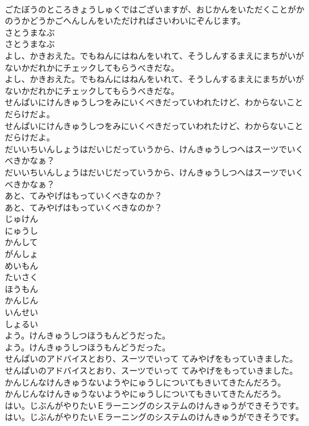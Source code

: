 \documentclass[8pt]{extreport}
\begin{document}
\begin{CJK}{UTF8}{min}
\\	ごたぼうのところきょうしゅくではございますが、おじかんをいただくことがかのうかどうかごへんしんをいただければさいわいにぞんじます。
\\	さとうまなぶ
\\	さとうまなぶ
\\	よし、かきおえた。でもねんにはねんをいれて、そうしんするまえにまちがいがないかだれかにチェックしてもらうべきだな。
\\	よし、かきおえた。でもねんにはねんをいれて、そうしんするまえにまちがいがないかだれかにチェックしてもらうべきだな。
\\	せんぱいにけんきゅうしつをみにいくべきだっていわれたけど、わからないことだらけだよ。
\\	せんぱいにけんきゅうしつをみにいくべきだっていわれたけど、わからないことだらけだよ。
\\	だいいちいんしょうはだいじだっていうから、けんきゅうしつへはスーツでいくべきかなぁ？
\\	だいいちいんしょうはだいじだっていうから、けんきゅうしつへはスーツでいくべきかなぁ？
\\	あと、てみやげはもっていくべきなのか？
\\	あと、てみやげはもっていくべきなのか？
\\	じゅけん
\\	にゅうし
\\	かんして
\\	がんしょ
\\	めいもん
\\	たいさく
\\	ほうもん
\\	かんじん
\\	いんせい
\\	しょるい
\\	よう。けんきゅうしつほうもんどうだった。
\\	よう。けんきゅうしつほうもんどうだった。
\\	せんぱいのアドバイスとおり、スーツでいって てみやげをもっていきました。
\\	せんぱいのアドバイスとおり、スーツでいって てみやげをもっていきました。
\\	かんじんなけんきゅうないようやにゅうしについてもきいてきたんだろう。
\\	かんじんなけんきゅうないようやにゅうしについてもきいてきたんだろう。
\\	はい。じぶんがやりたいＥラーニングのシステムのけんきゅうができそうです。
\\	はい。じぶんがやりたいＥラーニングのシステムのけんきゅうができそうです。

\end{CJK}
\end{document}

